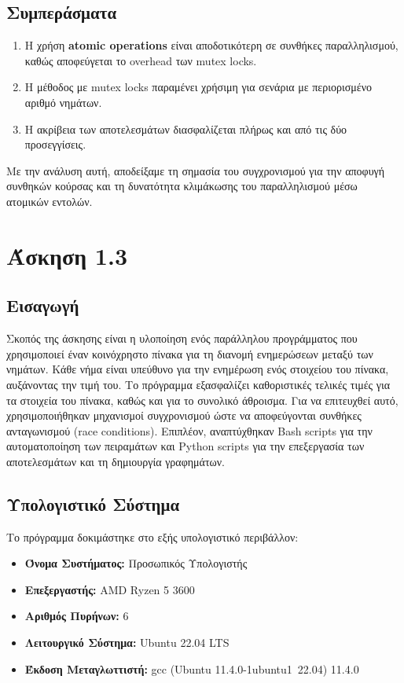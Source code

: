 \documentclass{article}
\begin{document}
\subsection*{Συμπεράσματα}
\begin{enumerate} 
    \item Η χρήση \textbf{atomic operations} είναι αποδοτικότερη σε συνθήκες παραλληλισμού, καθώς αποφεύγεται το overhead των mutex locks. 
    \item Η μέθοδος με mutex locks παραμένει χρήσιμη για σενάρια με περιορισμένο αριθμό νημάτων. 
    \item Η ακρίβεια των αποτελεσμάτων διασφαλίζεται πλήρως και από τις δύο προσεγγίσεις. 
\end{enumerate} 
Με την ανάλυση αυτή, αποδείξαμε τη σημασία του συγχρονισμού για την αποφυγή συνθηκών κούρσας και τη δυνατότητα κλιμάκωσης του παραλληλισμού μέσω ατομικών εντολών.
\section*{Άσκηση 1.3}
\subsection*{Εισαγωγή}
Σκοπός της άσκησης είναι η υλοποίηση ενός παράλληλου προγράμματος που χρησιμοποιεί έναν κοινόχρηστο πίνακα για τη διανομή ενημερώσεων μεταξύ των νημάτων. Κάθε νήμα είναι υπεύθυνο για την ενημέρωση ενός στοιχείου του πίνακα, αυξάνοντας την τιμή του. Το πρόγραμμα εξασφαλίζει καθοριστικές τελικές τιμές για τα στοιχεία του πίνακα, καθώς και για το συνολικό άθροισμα. Για να επιτευχθεί αυτό, χρησιμοποιήθηκαν μηχανισμοί συγχρονισμού ώστε να αποφεύγονται συνθήκες ανταγωνισμού (race conditions). Επιπλέον, αναπτύχθηκαν Bash scripts για την αυτοματοποίηση των πειραμάτων και Python scripts για την επεξεργασία των αποτελεσμάτων και τη δημιουργία γραφημάτων.
\subsection*{Υπολογιστικό Σύστημα}
Το πρόγραμμα δοκιμάστηκε στο εξής υπολογιστικό περιβάλλον:
\begin{itemize}
    \item \textbf{Όνομα Συστήματος:} Προσωπικός Υπολογιστής
    \item \textbf{Επεξεργαστής:} AMD Ryzen 5 3600
    \item \textbf{Αριθμός Πυρήνων:} 6
    \item \textbf{Λειτουργικό Σύστημα:} Ubuntu 22.04 LTS
    \item \textbf{Έκδοση Μεταγλωττιστή:} gcc (Ubuntu 11.4.0-1ubuntu1~22.04) 11.4.0
\end{itemize}
\end{document}
